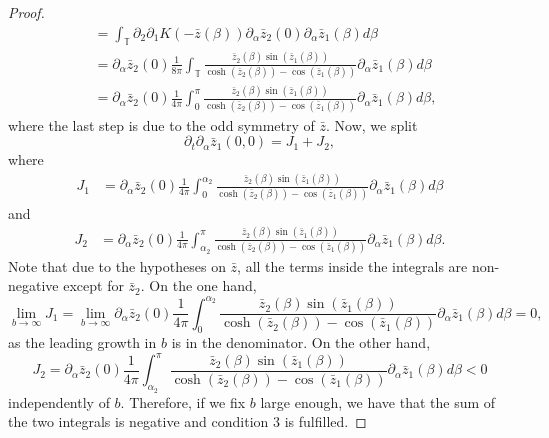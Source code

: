 \documentclass[11pt]{article}
\numberwithin{equation}{section}
\newcommand{\p}{\partial}
\begin{document}
\begin{proof}
\begin{align}
     & = \int_\mathbb{T} \p_2 \p_1 K(  - \bar{z}(\beta)) \partial_\alpha \bar z_2(0) \partial_\alpha \bar z_1(\beta) d\beta \nonumber  \\
     & =\partial_\alpha \bar z_2(0) \frac{1}{8\pi}  \int_\mathbb{T} \frac{\bar z_2(\beta) \sin(\bar z_1(\beta))}{\cosh(\bar z_2(\beta))-\cos(\bar z_1(\beta))} \partial_\alpha \bar z_1(\beta) d\beta \nonumber \\
     & = \partial_\alpha \bar z_2(0) \frac{1}{4\pi}  \int_{0}^\pi \frac{\bar z_2(\beta) \sin(\bar z_1(\beta))}{\cosh(\bar z_2(\beta))-\cos(\bar z_1(\beta))} \partial_\alpha \bar z_1(\beta) d\beta, \label{eq:turningint}
\end{align}
where the last step is due to the odd symmetry of $\bar{z}$. Now, we split 
\begin{equation*}
     \partial_t \partial_\alpha \bar{z}_1(0,0) = J_1 + J_2,
\end{equation*}
where
\begin{align*}
    J_1 &= \partial_\alpha \bar z_2(0) \frac{1}{4\pi}  \int_{0}^{\alpha_2}  \frac{\bar z_2(\beta) \sin(\bar z_1(\beta))}{\cosh(\bar z_2(\beta))-\cos(\bar z_1(\beta))} \partial_\alpha \bar z_1(\beta) d\beta 
\end{align*}
and 
\begin{align*}
    J_2 &= \partial_\alpha \bar z_2(0) \frac{1}{4\pi}  \int_{\alpha_2}^{{\pi}} \frac{\bar z_2(\beta) \sin(\bar z_1(\beta))}{\cosh(\bar z_2(\beta))-\cos(\bar z_1(\beta))} \partial_\alpha \bar z_1(\beta) d\beta. 
\end{align*}
Note that due to the hypotheses on $\bar{z}$, all the terms inside the integrals are non-negative except for $\bar z_2$. On the one hand, 
\begin{equation}
\lim_{b \to \infty} J_1 = \lim_{b \to \infty} \partial_\alpha \bar z_2(0) \frac{1}{4\pi}  \int_{0}^{\alpha_2}  \frac{\bar z_2(\beta) \sin(\bar z_1(\beta))}{\cosh(\bar z_2(\beta))-\cos(\bar z_1(\beta))} \partial_\alpha \bar z_1(\beta) d\beta  =0,
\end{equation}
as the leading growth in $b$ is in the denominator.
On the other hand, 
\begin{equation}
  J_2 = \partial_\alpha \bar z_2(0) \frac{1}{4\pi}  \int_{\alpha_2}^{{\pi}} \frac{\bar z_2(\beta) \sin(\bar z_1(\beta))}{\cosh(\bar z_2(\beta))-\cos(\bar z_1(\beta))} \partial_\alpha \bar z_1(\beta) d\beta < 0
\end{equation}
independently of $b$. Therefore, if we fix $b$ large enough, we have that the sum of the two integrals is negative and condition 3 is fulfilled. 
\end{proof}
\end{document}
